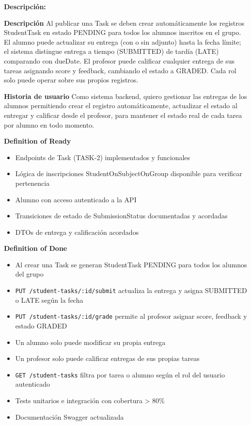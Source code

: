 \documentclass[
  spanish,
  11pt,
]{report}
\providecommand{\tightlist}{%
  \setlength{\itemsep}{0pt}\setlength{\parskip}{0pt}}
\begin{document}
\textbf{Descripción:}

\textbf{Descripción} Al publicar una Task se deben crear automáticamente
los registros StudentTask en estado PENDING para todos los alumnos
inscritos en el grupo. El alumno puede actualizar su entrega (con o sin
adjunto) hasta la fecha límite; el sistema distingue entrega a tiempo
(SUBMITTED) de tardía (LATE) comparando con dueDate. El profesor puede
calificar cualquier entrega de sus tareas asignando score y feedback,
cambiando el estado a GRADED. Cada rol solo puede operar sobre sus
propios registros.

\textbf{Historia de usuario} Como sistema backend, quiero gestionar las
entregas de los alumnos permitiendo crear el registro automáticamente,
actualizar el estado al entregar y calificar desde el profesor, para
mantener el estado real de cada tarea por alumno en todo momento.

\textbf{Definition of Ready}

\begin{itemize}
\tightlist
\item
  Endpoints de Task (TASK-2) implementados y funcionales
\item
  Lógica de inscripciones StudentOnSubjectOnGroup disponible para
  verificar pertenencia
\item
  Alumno con acceso autenticado a la API
\item
  Transiciones de estado de SubmissionStatus documentadas y acordadas
\item
  DTOs de entrega y calificación acordados
\end{itemize}

\textbf{Definition of Done}

\begin{itemize}
\tightlist
\item
  Al crear una Task se generan StudentTask PENDING para todos los
  alumnos del grupo
\item
  \texttt{PUT\ /student-tasks/:id/submit} actualiza la entrega y asigna
  SUBMITTED o LATE según la fecha
\item
  \texttt{PUT\ /student-tasks/:id/grade} permite al profesor asignar
  score, feedback y estado GRADED
\item
  Un alumno solo puede modificar su propia entrega
\item
  Un profesor solo puede calificar entregas de sus propias tareas
\item
  \texttt{GET\ /student-tasks} filtra por tarea o alumno según el rol
  del usuario autenticado
\item
  Tests unitarios e integración con cobertura \textgreater{} 80\%
\item
  Documentación Swagger actualizada
\end{itemize}
\end{document}
